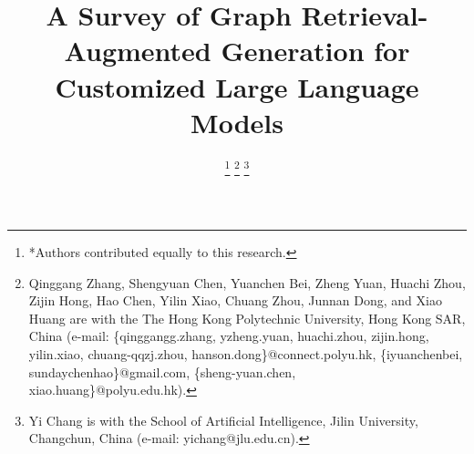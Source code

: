 \documentclass[lettersize,journal]{IEEEtran}
\begin{document}
\title{A Survey of Graph Retrieval-Augmented Generation for Customized Large Language Models}






\author{


\thanks{*Authors contributed equally to this research.}
\thanks{Qinggang Zhang, Shengyuan Chen, Yuanchen Bei, Zheng Yuan, Huachi Zhou, Zijin Hong, Hao Chen, Yilin Xiao, Chuang Zhou, Junnan Dong, and Xiao Huang are with the The Hong Kong Polytechnic University, Hong Kong SAR, China (e-mail: \{qinggangg.zhang, yzheng.yuan, huachi.zhou, zijin.hong, yilin.xiao, chuang-qqzj.zhou, hanson.dong\}@connect.polyu.hk, \{iyuanchenbei, sundaychenhao\}@gmail.com, \{sheng-yuan.chen, xiao.huang\}@polyu.edu.hk).}
\thanks{Yi Chang is with the School of Artificial Intelligence, Jilin University, Changchun, China (e-mail: yichang@jlu.edu.cn).}
}
\end{document}
